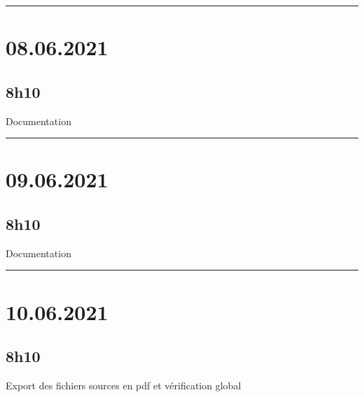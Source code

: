 \documentclass[a4paper,12pt,french]{sphinxmanual}
\begin{document}
\bigskip\hrule\bigskip



\section{08.06.2021}
\label{\detokenize{logbook:id196}}

\subsection{8h10}
\label{\detokenize{logbook:id197}}
\sphinxAtStartPar
Documentation


\bigskip\hrule\bigskip



\section{09.06.2021}
\label{\detokenize{logbook:id198}}

\subsection{8h10}
\label{\detokenize{logbook:id199}}
\sphinxAtStartPar
Documentation


\bigskip\hrule\bigskip



\section{10.06.2021}
\label{\detokenize{logbook:id200}}

\subsection{8h10}
\label{\detokenize{logbook:id201}}
\sphinxAtStartPar
Export des fichiers sources en pdf et vérification global



\renewcommand{\indexname}{Index}
\printindex
\end{document}
